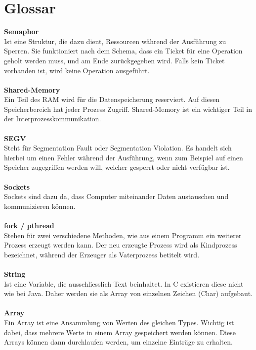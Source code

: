 \documentclass[12pt,a4paper,ngerman]{report}
\begin{document}
\chapter*{Glossar}
\textbf{Semaphor}\\
Ist eine Struktur, die dazu dient, Ressourcen während der Ausführung zu Sperren. Sie funktioniert nach dem Schema, dass ein Ticket für eine Operation geholt werden muss, und am Ende zurückgegeben wird. Falls kein Ticket vorhanden ist, wird keine Operation ausgeführt.\\
\\
\textbf{Shared-Memory}\\
Ein Teil des RAM wird für die Datenspeicherung reserviert. Auf diesen Speicherbereich hat jeder Prozess Zugriff. Shared-Memory ist ein wichtiger Teil in der Interprozesskommunikation.\\
\\
\textbf{SEGV}\\
Steht für Segmentation Fault oder Segmentation Violation. Es handelt sich hierbei um einen Fehler während der Ausführung, wenn zum Beispiel auf einen Speicher zugegriffen werden will, welcher gesperrt oder nicht verfügbar ist. \\
\\
\textbf{Sockets}\\
Sockets sind dazu da, dass Computer miteinander Daten austauschen und kommunizieren können. \\
\\
\textbf{fork / pthread}\\
Stehen für zwei verschiedene Methoden, wie aus einem Programm ein weiterer Prozess erzeugt werden kann. Der neu erzeugte Prozess wird als Kindprozess bezeichnet, während der Erzeuger als Vaterprozess betitelt wird.\\
\\
\textbf{String}\\
Ist eine Variable, die ausschliesslich Text beinhaltet. In C existieren diese nicht wie bei Java. Daher werden sie als Array von einzelnen Zeichen (Char) aufgebaut.\\
\\
\textbf{Array}\\
Ein Array ist eine Ansammlung von Werten des gleichen Types. Wichtig ist dabei, dass mehrere Werte in einem Array gespeichert werden können. Diese Arrays können dann durchlaufen werden, um einzelne Einträge zu erhalten.


\nocite{socketserver}
\nocite{fork1}
\nocite{fork2}
\nocite{socketclient}
\nocite{stcmp}
\nocite{substring}
\nocite{gitbk}
\nocite{semctl}
\nocite{unix_environment}
\end{document}
